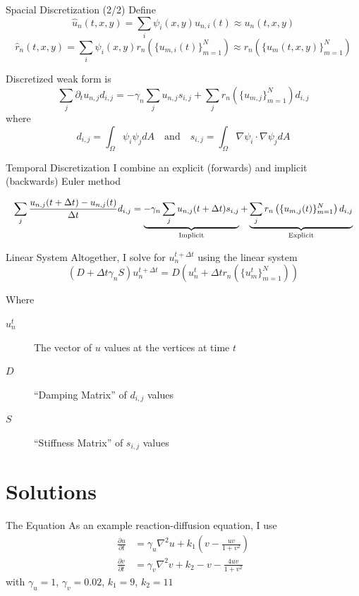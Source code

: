 \documentclass{beamer}
\begin{document}
\begin{frame}{Spacial Discretization (2/2)}
    Define
    \[
        \hat{u}_n (t, x, y) = \sum_i \psi_i (x, y) u_{n, i} (t) \approx u_n (t, x, y)
    \]
    \[
        \hat{r}_n (t, x, y) = \sum_i \psi_i (x, y) r_n \left(\{u_{m, i}(t)\}_{m = 1}^N\right) \approx r_n \left(\{u_m(t, x, y)\}_{m = 1}^N\right)
    \]

    Discretized weak form is
    \[
        \sum_j \partial_t u_{n, j} d_{i,j}  = -\gamma_n \sum_j u_{n, j} s_{i,j} + \sum_j r_n \left(\{u_{m, j}\}_{m = 1}^N\right) d_{i,j}
    \]
    where
    \[
        d_{i,j} = \int_\Omega \psi_i \psi_j dA \quad \text{and} \quad s_{i,j} = \int_\Omega \nabla \psi_i \cdot \nabla \psi_j dA
    \]
\end{frame}

\begin{frame}{Temporal Discretization}
    I combine an \alert{explicit} (forwards) and \alert{implicit} (backwards) Euler method

    \[
        \resizebox{\textwidth}{!}{%
        $\displaystyle \sum_j \frac{u_{n, j} (t + \Delta t) - u_{n, j} (t)}{\Delta t} d_{i,j} = \underbrace{-\gamma_n \sum_j u_{n, j} (t + \Delta t) s_{i,j}}_{\text{Implicit}} + \underbrace{\sum_j r_n \left(\{u_{m, j} (t)\}_{m = 1}^N\right) d_{i,j}}_{\text{Explicit}}$%
        }
    \]
\end{frame}

\begin{frame}{Linear System}
    Altogether, I solve for $u_n^{t + \Delta t}$ using the linear system
    \[
        (D + \Delta t \gamma_n S) u_n^{t + \Delta t} = D \left(u_n^t + \Delta t r_n \left(\{u_m^t\}_{m = 1}^N\right)\right)
    \]
    {\scriptsize
    Where
    \begin{description}
        \item[$u_n^t$] The vector of $u$ values at the vertices at time $t$
        \item[$D$] ``Damping Matrix'' of $d_{i,j}$ values
        \item[$S$] ``Stiffness Matrix'' of $s_{i,j}$ values
    \end{description}
    }
\end{frame}


\section{Solutions}

\begin{frame}{The Equation}
    As an example reaction-diffusion equation, I use
    \begin{align*}
        \frac{\partial u}{\partial t} &= \gamma_u \nabla^2 u + k_1 \left(v - \frac{uv}{1 + v^2}\right) \\
        \frac{\partial v}{\partial t} &= \gamma_v \nabla^2 v + k_2 - v - \frac{4 u v}{1 + v^2}
    \end{align*}
    with $\gamma_u = 1$, $\gamma_v = 0.02$, $k_1 = 9$, $k_2 = 11$
\end{frame}
\end{document}

